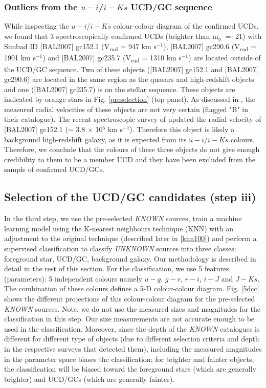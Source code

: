\documentclass[fleqn,usenatbib]{mnras}
\begin{document}
\subsubsection{Outliers from the $u-i$/$i-Ks$ UCD/GC sequence }
While inspecting the $u-i$/$i-Ks$ colour-colour diagram of the confirmed UCDs, we found that 3 spectroscopically confirmed UCDs (brighter than m$_g$ $=$ 21) with Simbad ID [BAL2007] gc152.1 (V\textsubscript{rad} = 947 km s$^{-1}$), [BAL2007] gc290.6 (V\textsubscript{rad} = 1901 km s$^{-1}$) and [BAL2007] gc235.7 (V\textsubscript{rad} = 1310 km s$^{-1}$) are located outside of the UCD/GC sequence. Two of these objects ([BAL2007] gc152.1 and [BAL2007] gc290.6) are located in the same region as the quasars and high-redshift objects and one ([BAL2007] gc235.7) is on the stellar sequence. These objects are indicated by orange stars in Fig. \ref{preselection} (top panel). As discussed in \citealp{bergond2007}, the measured radial velocities of these objects are not very certain (flagged "B" in their catalogue). The recent spectroscopic survey of \citet{Maddox-2019} updated the radial velocity of [BAL2007] gc152.1 ($\sim$ 3.8 $\times$ 10$^5$ km s$^{-1}$). Therefore this object is likely a background high-redshift galaxy, as it is expected from its $u-i$/$i-Ks$ colours. Therefore, we conclude that the colours of these three objects do not give enough credibility to them to be a member UCD and they have been excluded from the sample of confirmed UCD/GCs.

\subsection{Selection of the UCD/GC candidates (step iii)}

In the third step, we use the pre-selected \textit{KNOWN} sources, train a machine learning model using the K-nearest neighbours technique (KNN) with an adjustment to the original technique (described later in \ref{knn100}) and perform a supervised classification to classify \textit{UNKNOWN} sources into three classes: foreground star, UCD/GC, background galaxy. Our methodology is described in detail in the rest of this section. For the classification, we use 5 features (parameters): 5 independent colours namely $u-g$, $g-r$, $r-i$, $i-J$ and $J-Ks$. The combination of these colours defines a 5-D colour-colour diagram. Fig. \ref{5dcc} shows the different projections of this colour-colour diagram for the pre-selected \textit{KNOWN} sources. Note, we do not use the measured sizes and magnitudes for the classification in this step. Our size measurements are not accurate enough to be used in the classification. Moreover, since the depth of the \textit{KNOWN} catalogues is different for different type of objects (due to different selection criteria and depth in the respective surveys that detected them), including the measured magnitudes in the parameter space biases the classification; for brighter and fainter objects, the classification will be biased toward the foreground stars (which are generally brighter) and UCD/GCs (which are generally fainter). 
\end{document}
